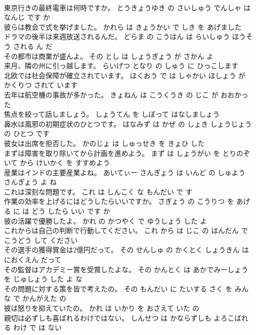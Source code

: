 \documentclass[8pt]{extreport}
\begin{document}
\begin{CJK}{UTF8}{min}
\\	東京行きの最終電車は何時ですか。	とうきょうゆき の さいしゅう でんしゃ は なんじ です か 
\\	彼らは教会で式を挙げました。	かれら は きょうかい で しき を あげました 
\\	ドラマの後半は来週放送されるんだ。	どらま の こうはん は らいしゅう ほうそう される ん だ 
\\	その都市は商業が盛んよ。	その とし は しょうぎょう が さかん よ 
\\	来月、隣の州に引っ越します。	らいげつ となり の しゅう に ひっこします 
\\	北欧では社会保障が確立されています。	ほくおう で は しゃかい ほしょう が かくりつ されて います 
\\	去年は航空機の事故が多かった。	きょねん は こうくうき の じこ が おおかった 
\\	焦点を絞って話しましょう。	しょうてん を しぼって はなしましょう 
\\	鼻水は風邪の初期症状のひとつです。	はなみず は かぜ の しょき しょうじょう の ひとつ です 
\\	彼女は出席を拒否した。	かのじょ は しゅっせき を きょひ した 
\\	まずは障害を取り除いてから計画を進めよう。	まず は しょうがい を とりのぞいて から けいかく を すすめよう 
\\	産業はインドの主要産業よね。	あいてぃー さんぎょう は いんど の しゅよう さんぎょう よ ね 
\\	これは深刻な問題です。	これ は しんこく な もんだい で す 
\\	作業の効率を上げるにはどうしたらいいですか。	さぎょう の こうりつ を あげる に は どう したら いい です か 
\\	彼の活躍で優勝したよ。	かれ の かつやく で ゆうしょう した よ 
\\	これからは自己の判断で行動してください。	これ から は じこ の はんだん で こうどう して ください 
\\	その選手の獲得賞金は2億円だって。	その せんしゅ の かくとく しょうきん は におくえん だって 
\\	その監督はアカデミー賞を受賞したよな。	その かんとく は あかでみーしょう を じゅしょう した よ な 
\\	その問題に対する策を皆で考えたの。	その もんだい に たいする さく を みんな で かんがえた の 
\\	彼は怒りを抑えていたの。	かれ は いかり を おさえて いた の 
\\	親切は必ずしも喜ばれるわけではない。	しんせつ は かならずしも よろこばれる わけ で は ない 

\end{CJK}
\end{document}

